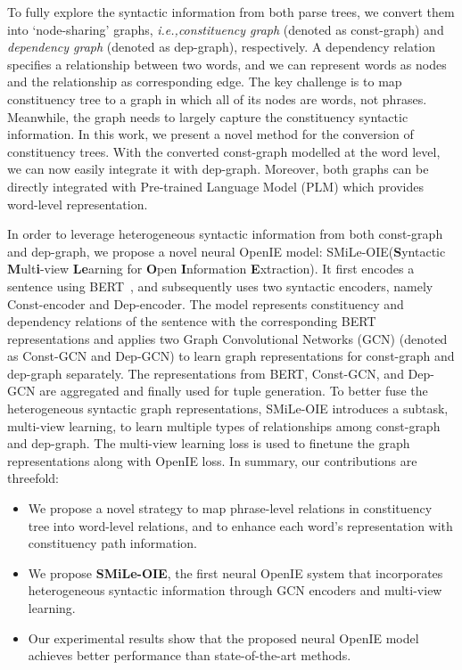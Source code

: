 \documentclass[11pt]{article}
\newcommand{\ie}{\emph{i.e.,}\xspace}
\newcommand{\mname}{SMiLe-OIE\xspace}
\begin{document}
To fully explore the syntactic information from both parse trees, we convert them into `node-sharing' graphs, \ie \textit{constituency graph} (denoted as const-graph) and \textit{dependency graph} (denoted as dep-graph), respectively. 
A dependency relation specifies a relationship between two words, and we can represent words as nodes and the relationship as corresponding edge. The key challenge is to map constituency tree to a graph in which all of its nodes are words, not phrases. Meanwhile, the graph needs to largely capture the constituency syntactic information. 
In this work, we present a novel method for the conversion of constituency trees.
With the converted const-graph modelled at the word level, we can now easily integrate it with dep-graph. Moreover, both graphs can be directly integrated with Pre-trained Language Model (PLM) which provides word-level representation.

In order to leverage heterogeneous syntactic information from both const-graph and dep-graph, we propose a novel neural OpenIE model: \mname  (\textbf{S}yntactic \textbf{M}ult\textbf{i}-view \textbf{Le}arning for \textbf{O}pen \textbf{I}nformation \textbf{E}xtraction). 
It first encodes a sentence using BERT~\cite{devlin2018bert}, and subsequently uses two syntactic encoders, namely Const-encoder and Dep-encoder. The model represents constituency and dependency relations of the sentence with the corresponding BERT representations and applies two Graph Convolutional Networks (GCN) (denoted as Const-GCN and Dep-GCN) to learn graph representations for const-graph and dep-graph separately. The representations from BERT, Const-GCN, and Dep-GCN are aggregated and finally used for tuple generation.
To better fuse the heterogeneous syntactic graph representations, \mname introduces a subtask, multi-view learning, to learn multiple types of relationships among const-graph and dep-graph. The multi-view learning loss is used to finetune the graph representations along with OpenIE loss. In summary, our contributions are threefold:
\begin{itemize}[noitemsep,leftmargin=5.5mm]
  \item We propose a novel strategy to map phrase-level relations in constituency tree into word-level relations, and to enhance each word's representation with constituency path information.
  \item We propose \textbf{\mname}, the first neural OpenIE system that incorporates heterogeneous syntactic information through GCN encoders and multi-view learning.
  \item Our experimental results show that the proposed neural OpenIE model achieves better performance than state-of-the-art methods.
\end{itemize}
\end{document}

